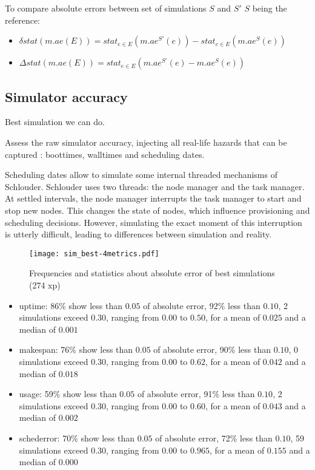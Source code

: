 \documentclass[a4paper,10pt]{article}
\newcommand\vrpath{../../lab/setup/simschlouder/validation-results/}
\begin{document}
To compare absolute errors between set of simulations $S$ and $S'$
$S$ being the reference:
\begin{itemize}
 \item $\delta stat(m.ae(E)) = stat_{e \in E} ( m.ae^{S'}(e) ) - stat_{e \in E}( m.ae^S(e) )$
 \item $\Delta stat(m.ae(E)) = stat_{e \in E} ( m.ae^{S'}(e) - m.ae^S(e) )$
\end{itemize}




\subsection{Simulator accuracy}

Best simulation we can do.

Assess the raw simulator accuracy, injecting all real-life hazards that can be 
captured :
boottimes, walltimes and scheduling dates.

Scheduling dates allow to simulate some internal threaded mechanisms of 
Schlouder.
Schlouder uses two threads: the node manager and the task manager.
At settled intervals, the node manager interrupts the task manager to start and 
stop new nodes.
This changes the state of nodes, which influence provisioning and scheduling 
decisions.
However, simulating the exact moment of this interruption is utterly difficult, 
leading to differences between simulation and reality.


\begin{figure}
  \centering

  \texttt{[image: sim\_best-4metrics.pdf]}
  
  
  
\caption{Frequencies and statistics about absolute error of best simulations (274 xp)}
\end{figure} 

 


\begin{itemize}
 \item uptime: 
      86\% show less than $0.05$ of absolute error, 
      92\% less than $0.10$, 
      2 simulations exceed $0.30$,
      ranging from $0.00$ to $0.50$, for a mean of $0.025$ and a median of $0.001$
 \item makespan: 
      76\% show less than $0.05$ of absolute error, 
      90\% less than $0.10$, 
      0 simulations exceed $0.30$,
      ranging from $0.00$ to $0.62$, for a mean of $0.042$ and a median of $0.018$
 \item usage: 
      59\% show less than $0.05$ of absolute error, 
      91\% less than $0.10$, 
      2 simulations exceed $0.30$,
      ranging from $0.00$ to $0.60$, for a mean of $0.043$ and a median of $0.002$
 \item schederror: 
      70\% show less than $0.05$ of absolute error, 
      72\% less than $0.10$, 
      59 simulations exceed $0.30$,
      ranging from $0.00$ to $0.965$, for a mean of $0.155$ and a median of $0.000$
\end{itemize}
\end{document}

